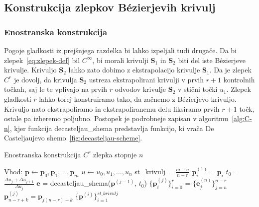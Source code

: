 \documentclass[isrm2, tisk]{fmfdelo}
\newcommand{\p}{\mathbf{p}}
\begin{document}
    \subsection{Konstrukcija zlepkov Bézierjevih krivulj}\label{subsec:konstrukcija-zlepkov}

    \subsubsection{Enostranska konstrukcija}
    Pogoje gladkosti iz prejšnjega razdelka bi lahko izpeljali tudi drugače.
    Da bi zlepek~\eqref{eq:zlepek-def} bil $C^{\infty}$, bi morali krivulji $\mathbf{S}_1$ in $\mathbf{S}_2$ biti del iste Bézierjeve krivulje.
    Krivuljo $\mathbf{S}_2$ lahko zato dobimo z ekstrapolacijo krivulje $\mathbf{S}_1$.
    Da je zlepek $C^r$ je dovolj, da krivulja $\mathbf{S}_2$ ustreza ekstrapolirani krivulji v prvih $r+1$ kontrolnih točkah, saj le te vplivajo na prvih $r$ odvodov krivulje $\mathbf{S}_2$ v stični točki $u_1$.
    Zlepek gladkosti $r$ lahko torej konstruiramo tako, da začnemo z Bézierjevo krivuljo.
    Krivuljo nato ekstrapoliramo in ekstrapoliranemu delu fiksiramo prvih $r+1$ točk, ostale pa izberemo poljubno.
    Postopek je podrobneje zapisan v algoritmu~\ref{alg:C-n}, kjer funkcija decasteljau\_shema predstavlja funkcijo, ki vrača De Casteljaujevo shemo~\ref{fig:decasteljau-scheme}.
    \begin{algorithm}[H]
        \caption{Enostranska konstrukcija $C^r$ zlepka stopnje $n$}
        \label{alg:C-n}
        \begin{algorithmic}
            \State Vhod:
            \State $\p \gets \p_0,\p_1,\dots,\p_{m}$
            \State $u \gets u_0,u_1,\dots,u_n$
            \State
            \State st\_krivulj = $\frac{m-n}{n-r}$
                \State $\p_i^{(1)}=\p_i$
            \EndFor
                \State $t_0$ = $\frac{\Delta u_j + \Delta u_{j+1}}{\Delta u_j}$
                \State $\mathbf{e}$ = decasteljau\_shema($\p^{(j-1)}$, $t_0$)
                \State $\{\p_i^{(j)}\}_{i=0}^{r}$ = $\{\mathbf{e}^{(n)}_{j}\}_{j=n}^{n-r}$
                    \State $\p_{n-r+k}^{(j)}=\p_{j(n-r)+k}$
                \EndFor
            \EndFor
            \State
            \State \Return $\{\mathbf{p}^{(i)}\}^{st\_krivulj}_{i=1}$
        \end{algorithmic}
    \end{algorithm}
\end{document}

